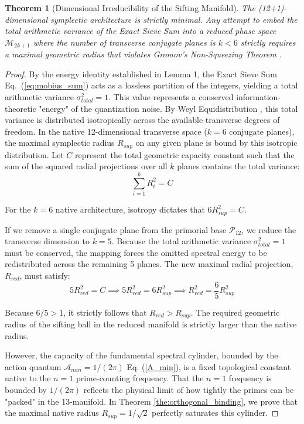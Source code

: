 \documentclass[sn-mathphys-num, pdflatex]{sn-jnl}
\newtheorem{theorem}{Theorem}[section]
\begin{document}
\begin{theorem}[Dimensional Irreducibility of the Sifting Manifold]
\label{the:dimensional_irreducibility}
The (12+1)-dimensional symplectic architecture is strictly minimal. Any attempt to embed the total arithmetic variance of the Exact Sieve Sum into a reduced phase space $\mathcal{M}_{2k+1}$ where the number of transverse conjugate planes is $k < 6$ strictly requires a maximal geometric radius that violates Gromov's Non-Squeezing Theorem \cite{gromov}.
\end{theorem}

\begin{proof}
By the energy identity established in Lemma 1, the Exact Sieve Sum Eq.~(\ref{eq:mobius_sum}) acts as a lossless partition of the integers, yielding a total arithmetic variance $\sigma_{total}^2 = 1$. This value represents a conserved information-theoretic "energy" of the quantization noise. 
By Weyl Equidistribution \cite{weyl}, this total variance is distributed isotropically across the available transverse degrees of freedom. In the native 12-dimensional transverse space ($k=6$ conjugate planes), the maximal symplectic radius $R_{sup}$ on any given plane is bound by this isotropic distribution. Let $C$ represent the total geometric capacity constant such that the sum of the squared radial projections over all $k$ planes contains the total variance:
$$ \sum_{i=1}^{k} R_i^2 = C $$

\noindent For the $k=6$ native architecture, isotropy dictates that $6 R_{sup}^2 = C$. 

If we remove a single conjugate plane from the primorial base $\mathcal{P}_{12}$, we reduce the transverse dimension to $k=5$. Because the total arithmetic variance $\sigma_{total}^2 = 1$ must be conserved, the mapping forces the omitted spectral energy to be redistributed across the remaining 5 planes. The new maximal radial projection, $R_{red}$, must satisfy:
$$ 5 R_{red}^2 = C \implies 5 R_{red}^2 = 6 R_{sup}^2 \implies R_{red}^2 = \frac{6}{5} R_{sup}^2 $$

\noindent Because $6/5 > 1$, it strictly follows that $R_{red} > R_{sup}$. The required geometric radius of the sifting ball in the reduced manifold is strictly larger than the native radius.

However, the capacity of the fundamental spectral cylinder, bounded by the action quantum $\mathcal{A}_{min} = 1/(2\pi)$ Eq. (\ref{A_min}), is a fixed topological constant native to the $n=1$ prime-counting frequency. That the $n=1$ frequency is bounded by $1/(2\pi)$ reflects the physical limit of how tightly the primes can be "packed" in the 13-manifold. In Theorem \ref{the:orthogonal_binding}, we prove that the maximal native radius $R_{sup} = 1/\sqrt{2}$ perfectly saturates this cylinder. 


\end{proof}
\end{document}
